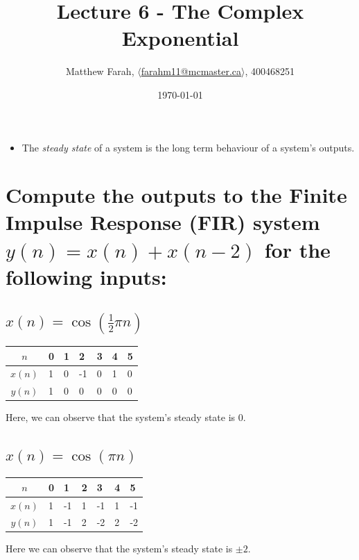 \documentclass{article}
\title{Lecture 6 - The Complex Exponential}
\author{Matthew Farah, \href{mailto:farahm11@mcmaster.ca}{$\langle$farahm11@mcmaster.ca$\rangle$}, 400468251}
\date{\today}
\renewcommand{\thesubsection}{\thesection.\alph{subsection}}
\begin{document}
\maketitle
\pagestyle{fancy}

\begin{itemize}
	\item The \emph{steady state} of a system is the long term behaviour of a system's outputs.
\end{itemize}

\section[Example ~\thesection]{Compute the outputs to the Finite Impulse Response (FIR) system $y(n) = x(n) + x(n-2)$ for the following inputs:}

\subsection[~\thesubsection]{$x(n) = \cos(\frac{1}{2}{\pi}n)$}

\begin{tabularx}{\linewidth}{| c || Y Y Y Y Y Y |}
	\hline
	$n$ & 0 & 1 & 2 & 3 & 4 & 5 \\
	\hline
	$x(n)$ & 1 & 0 & -1 & 0 & 1 & 0 \\
	$y(n)$ & 1 & 0 & 0 & 0 & 0 & 0 \\
	\hline
\end{tabularx}

\vspace{.3cm}

Here, we can observe that the system's steady state is 0.

\subsection[~\thesubsection]{$x(n) = \cos({\pi}n)$}

\begin{tabularx}{\linewidth}{| c || Y Y Y Y Y Y |}
	\hline
	$n$ & 0 & 1 & 2 & 3 & 4 & 5 \\
	\hline
	$x(n)$ & 1 & -1 & 1 & -1 & 1 & -1 \\
	$y(n)$ & 1 & -1 & 2 & -2 & 2 & -2 \\
	\hline
\end{tabularx}

\vspace{.3cm}

Here we can observe that the system's steady state is $\pm2$.
\end{document}
